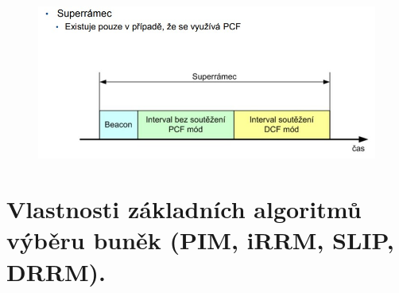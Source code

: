 \begin{figure}[ht]
\centering
  \begin{center}
    \includegraphics[scale=0.7]{images/superramec.jpg}
  \end{center}
\end{figure}


\newpage
\section{Vlastnosti základních algoritmů výběru buněk (PIM, iRRM, SLIP, DRRM).}
